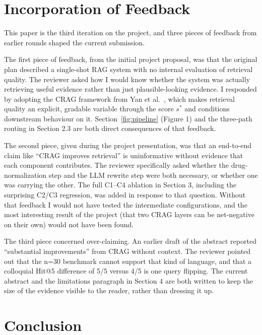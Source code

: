 \documentclass[12pt]{article}
\begin{document}
\section{Incorporation of Feedback}

This paper is the third iteration on the project, and three pieces of feedback from earlier rounds shaped the current submission.

The first piece of feedback, from the initial project proposal, was that the original plan described a single-shot RAG system with no internal evaluation of retrieval quality. The reviewer asked how I would know whether the system was actually retrieving useful evidence rather than just plausible-looking evidence. I responded by adopting the CRAG framework from Yan et al.~\cite{yan2024crag}, which makes retrieval quality an explicit, gradable variable through the score $s^*$ and conditions downstream behaviour on it. Section~\ref{fig:pipeline} (Figure 1) and the three-path routing in Section 2.3 are both direct consequences of that feedback.

The second piece, given during the project presentation, was that an end-to-end claim like ``CRAG improves retrieval'' is uninformative without evidence that each component contributes. The reviewer specifically asked whether the drug-normalization step and the LLM rewrite step were both necessary, or whether one was carrying the other. The full C1--C4 ablation in Section 3, including the surprising C2/C3 regression, was added in response to that question. Without that feedback I would not have tested the intermediate configurations, and the most interesting result of the project (that two CRAG layers can be net-negative on their own) would not have been found.

The third piece concerned over-claiming. An earlier draft of the abstract reported ``substantial improvements'' from CRAG without context. The reviewer pointed out that the n=30 benchmark cannot support that kind of language, and that a colloquial Hit@5 difference of 5/5 versus 4/5 is one query flipping. The current abstract and the limitations paragraph in Section 4 are both written to keep the size of the evidence visible to the reader, rather than dressing it up.

\section{Conclusion}
\end{document}
